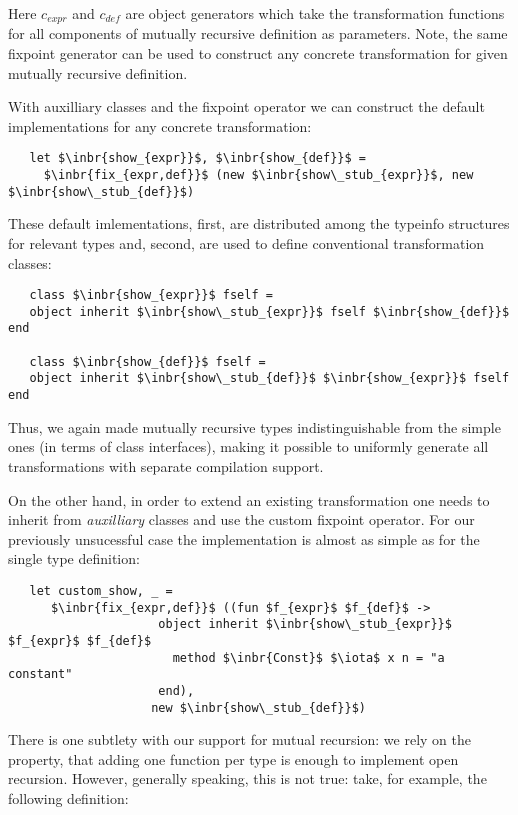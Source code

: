 Here $c_{expr}$ and $c_{def}$ are object generators which take the transformation functions for all components of mutually recursive definition
as parameters. Note, the same fixpoint generator can be used to construct any concrete transformation for given mutually recursive definition.

With auxilliary classes and the fixpoint operator we can construct the default implementations for any concrete transformation:

\begin{lstlisting}
   let $\inbr{show_{expr}}$, $\inbr{show_{def}}$ =
     $\inbr{fix_{expr,def}}$ (new $\inbr{show\_stub_{expr}}$, new $\inbr{show\_stub_{def}}$) 
\end{lstlisting}

These default imlementations, first, are distributed among the typeinfo structures for relevant types and, second, are used to define conventional
transformation classes:

\begin{lstlisting}
   class $\inbr{show_{expr}}$ fself =
   object inherit $\inbr{show\_stub_{expr}}$ fself $\inbr{show_{def}}$ end

   class $\inbr{show_{def}}$ fself =
   object inherit $\inbr{show\_stub_{def}}$ $\inbr{show_{expr}}$ fself end
\end{lstlisting}

Thus, we again made mutually recursive types indistinguishable from the simple ones (in terms of class interfaces), making it possible to
uniformly generate all transformations with separate compilation support.

On the other hand, in order to extend an existing transformation one needs to inherit from \emph{auxilliary} classes and use the custom fixpoint operator.
For our previously unsucessful case the implementation is almost as simple as for the single type definition:

\begin{lstlisting}
   let custom_show, _ =
      $\inbr{fix_{expr,def}}$ ((fun $f_{expr}$ $f_{def}$ ->
                     object inherit $\inbr{show\_stub_{expr}}$ $f_{expr}$ $f_{def}$
                       method $\inbr{Const}$ $\iota$ x n = "a constant"
                     end),
                    new $\inbr{show\_stub_{def}}$) 
\end{lstlisting}

There is one subtlety with our support for mutual recursion: we rely on the property, that adding one function per type is enough to implement open recursion.
However, generally speaking, this is not true: take, for example, the following definition:

